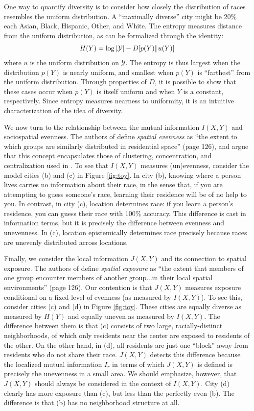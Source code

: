 	One way to quantify diversity is to consider how closely the distribution of races resembles the uniform distribution. A ``maximally diverse'' city might be 20\% each Asian, Black, Hispanic, Other, and White. The entropy measures distance from the uniform distribution, as can be formalized through the identity: 
	\begin{equation}
		H(Y) = \log \left|\mathcal{Y}\right| - D[p(Y)\|u(Y)]
	\end{equation}
	where $u$ is the uniform distribution on $\mathcal{Y}$. The entropy is thus largest when the distribution $p(Y)$ is nearly uniform, and smallest when $p(Y)$ is ``farthest'' from the uniform distribution. Through properties of $D$, it is possible to show that these cases occur when $p(Y)$ is itself uniform and when $Y$ is a constant, respectively. Since entropy measures nearness to uniformity, it is an intuitive characterization of the idea of diversity. 

	We now turn to the relationship between the mutual information $I(X,Y)$ and sociospatial evenness. The authors of \cite{Reardon2002} define \emph{spatial evenness} as ``the extent to which groups are similarly distributed in residential space'' (page 126), and argue that this concept encapsulates those of clustering, concentration, and centralization used in \cite{Massey1988}. To see that $I(X,Y)$ measures (un)evenness, consider the model cities (b) and (c) in Figure \ref{fig:toy}. In city (b), knowing where a person lives carries no information about their race, in the sense that, if you are attempting to guess someone's race, learning their residence will be of no help to you. In contrast, in city (c), location determines race: if you learn a person's residence, you can guess their race with 100\% accuracy. This difference is cast in information terms, but it is precisely the difference between evenness and unevenness. In (c), location epistemically determines race precisely because races are unevenly distributed across locations. 

	Finally, we consider the local information $J(X,Y)$ and its connection to spatial exposure. The authors of \cite{Reardon2002} define \emph{spatial exposure} as ``the extent that members of one group encounter members of another group...in their local spatial environments'' (page 126). Our contention is that $J(X,Y)$ measures exposure conditional on a fixed level of evenness (as measured by $I(X,Y)$). To see this, consider cities (c) and (d) in Figure \ref{fig:toy}. These cities are equally diverse as measured by $H(Y)$ and equally uneven as measured by $I(X,Y)$. The difference between them is that (c) consists of two large, racially-distinct neighborhoods, of which only residents near the center are exposed to residents of the other. On the other hand, in (d), all residents are just one ``block'' away from residents who do not share their race. $J(X,Y)$ detects this difference because the localized mutual information $I_r$ in terms of which $J(X,Y)$ is defined is precisely the unevenness in a small area. We should emphasize, however, that $J(X,Y)$ should always be considered in the context of $I(X,Y)$. City (d) clearly has more exposure than (c), but less than the perfectly even (b). The difference is that (b) has no neighborhood structure at all. 

